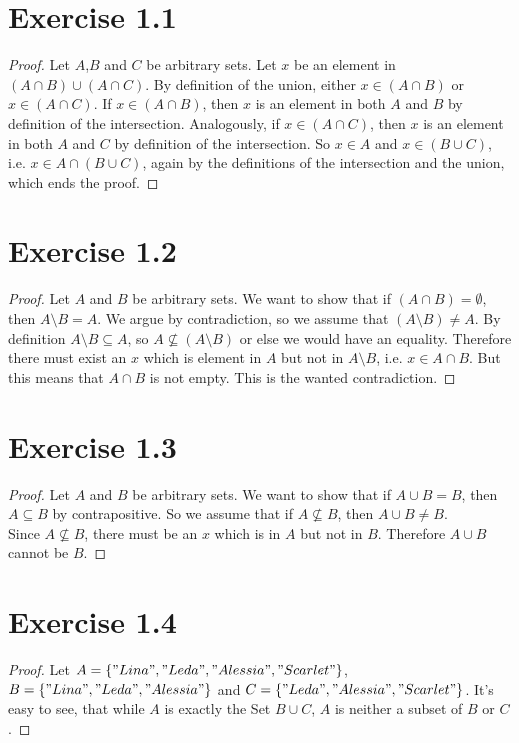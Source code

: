 \documentclass{article} %
\newcommand{\homeworkNumber}{1}
\begin{document}
\section*{Exercise \homeworkNumber.1}

\begin{proof}
Let $A$,$B$ and $C$ be arbitrary sets. Let $x$ be an element in $(A \cap B) \cup (A \cap C)$. By definition of the union, either $x \in (A \cap B)$ or $ x \in (A \cap C)$. If $x \in (A \cap B)$, then $x$ is an element in both $A$ and $B$ by definition of the intersection. Analogously, if $x \in (A \cap C)$, then $x$ is an element in both $A$ and $C$ by definition of the intersection. So $x \in A$ and $x \in (B \cup C)$, i.e. $x \in A \cap (B \cup C) $, again by the definitions of the intersection and the union, which ends the proof.

\end{proof}

\section*{Exercise \homeworkNumber.2}

\begin{proof}
Let $A$ and $B$ be arbitrary sets. We want to show that if $(A \cap B) = \emptyset$, then $A \setminus B = A$. We argue by contradiction, so we assume that $(A \setminus B) \neq A$.
By definition $A \setminus B \subseteq A$, so $A 	\not\subseteq (A \setminus B)$ or else we would have an equality. Therefore there must exist an $x$ which is element in $A$ but not in $A \setminus B$, i.e. $x \in A \cap B$. But this means that $A \cap B$ is not empty. This is the wanted contradiction.


\end{proof}


\section*{Exercise \homeworkNumber.3}

\begin{proof}
Let $A$ and $B$ be arbitrary sets. We want to show that if $A \cup B = B$, then $A \subseteq B$ by contrapositive. So we assume that if $A \not\subseteq B$, then $A \cup B \neq B$.\\
Since $A \not\subseteq B$, there must be an $x$ which is in $A$ but not in $B$. Therefore $A \cup B$ cannot be $B$.


\end{proof}

\section*{Exercise \homeworkNumber.4}

\begin{proof}
Let $A = \{"Lina", "Leda", "Alessia", "Scarlet"\}$, $B = \{"Lina", "Leda", "Alessia"\}$ and \linebreak $C  = \{"Leda", "Alessia", "Scarlet"\}$. It's easy to see, that while $A$ is exactly the Set $B \cup C$, $A$ is neither a subset of $B$ or $C$.

 
\end{proof}
\end{document}
